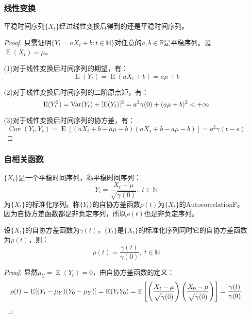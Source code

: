 \subsubsection{线性变换}
\begin{theorem}
	平稳时间序列$\{X_t\}$经过线性变换后得到的还是平稳时间序列。
\end{theorem}
\begin{proof}
	只需证明$\{Y_t=aX_t+b:t\in\mathbb{N}\}$对任意的$a,b\in\mathbb{R}$是平稳序列。设$\operatorname{E}(X_t)=\mu$。\par
	(1)对于线性变换后时间序列的期望，有：
	\begin{equation*}
		\operatorname{E}(Y_t)=\operatorname{E}(aX_t+b)=a\mu+b
	\end{equation*}\par
	(2)对于线性变换后时间序列的二阶原点矩，有：
	\begin{equation*}
		\operatorname{E}(Y_t^2)=\operatorname{Var}(Y_t)+[\operatorname{E}(Y_t)]^2=a^2\gamma(0)+(a\mu+b)^2<+\infty\qedhere
	\end{equation*}\par
	(3)对于线性变换后时间序列的协方差，有：
	\begin{equation*}
		\operatorname{Cov}(Y_t,Y_s)=\operatorname{E}[(aX_t+b-a\mu-b)(aX_s+b-a\mu-b)]=a^2\gamma(t-s)
	\end{equation*}
\end{proof}
\subsubsection{自相关函数}
\begin{definition}
	$\{X_t\}$是一个平稳时间序列，称平稳时间序列：
	\begin{equation*}
		Y_t=\frac{X_t-\mu}{\sqrt{\gamma(0)}},\;t\in\mathbb{N}
	\end{equation*}
	为$\{X_t\}$的标准化序列。称$\{Y_t\}$的自协方差函数$\rho(t)$为$\{X_t\}$的\gls{AutocorrelationF}。因为自协方差函数都是非负定序列，所以$\rho(t)$也是非负定序列。
\end{definition}
\begin{theorem}\label{theo:RhotGamma0}
	设$\{X_t\}$的自协方差函数为$\gamma(t)$，$\{Y_t\}$是$\{X_t\}$的标准化序列同时它的自协方差函数为$\rho(t)$，则：
	\begin{equation*}
		\rho(t)=\frac{\gamma(t)}{\gamma(0)},\;t\in\mathbb{N}
	\end{equation*}
\end{theorem}
\begin{proof}
	显然$\mu_Y=\operatorname{E}(Y_t)=0$，由自协方差函数的定义：
	\begin{equation*}
		\rho(t)=\operatorname{E}[(Y_t-\mu_Y)(Y_0-\mu_Y)]=\operatorname{E}(Y_tY_0)=\operatorname{E}\left[\left(\frac{X_t-\mu}{\sqrt{\gamma(0)}}\right)\left(\frac{X_0-\mu}{\sqrt{\gamma(0)}}\right)\right]=\frac{\gamma(t)}{\gamma(0)}\qedhere
	\end{equation*}
\end{proof}
